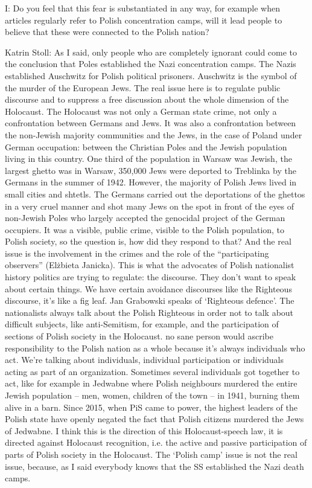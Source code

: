  

I: Do you feel that this fear is substantiated in any way, for example when articles regularly refer to Polish concentration camps, will it lead people to believe that these were connected to the Polish nation? 

 

Katrin Stoll: As I said, only people who are completely ignorant could come to the conclusion that Poles established the Nazi concentration camps. The Nazis established Auschwitz for Polish political prisoners. Auschwitz is the symbol of the murder of the European Jews. The real issue here is to regulate public discourse and to suppress a free discussion about the whole dimension of the Holocaust. The Holocaust was not only a German state crime, not only a confrontation between Germans and Jews. It was also a confrontation between the non-Jewish majority communities and the Jews, in the case of Poland under German occupation: between the Christian Poles and the Jewish population living in this country. One third of the population in Warsaw was Jewish, the largest ghetto was in Warsaw, 350,000 Jews were deported to Treblinka by the Germans in the summer of 1942. However, the majority of Polish Jews lived in small cities and shtetls. The Germans carried out the deportations of the ghettos in a very cruel manner and shot many Jews on the spot in front of the eyes of non-Jewish Poles who largely accepted the genocidal project of the German occupiers. It was a visible, public crime, visible to the Polish population, to Polish society, so the question is, how did they respond to that?  And the real issue is the involvement in the crimes and the role of the “participating observers” (Elżbieta Janicka). This is what the advocates of Polish nationalist history politics are trying to regulate: the discourse. They don’t want to speak about certain things. We have certain avoidance discourses like the Righteous discourse, it’s like a fig leaf. Jan Grabowski speaks of ‘Righteous defence’. The nationalists always talk about the Polish Righteous in order not to talk about difficult subjects, like anti-Semitism, for example, and the participation of sections of Polish society in the Holocaust. no sane person would ascribe responsibility to the Polish nation as a whole because it’s always individuals who act. We’re talking about individuals, individual participation or individuals acting as part of an organization. Sometimes several individuals got together to act, like for example in Jedwabne where Polish neighbours murdered the entire Jewish population – men, women, children of the town – in 1941, burning them alive in a barn. Since 2015, when PiS came to power, the highest leaders of the Polish state have openly negated the fact that Polish citizens murdered the Jews of Jedwabne. I think this is the direction of this Holocaust-speech law, it is directed against Holocaust recognition, i.e. the active and passive participation of parts of Polish society in the Holocaust. The ‘Polish camp’ issue is not the real issue, because, as I said everybody knows that the SS established the Nazi death camps. 

